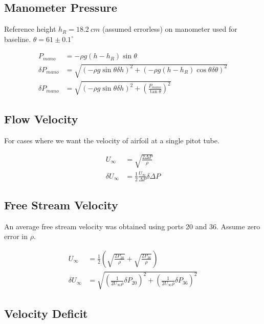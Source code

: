 \documentclass[runningheads]{llncs}
\begin{document}
\subsection{Manometer Pressure}

Reference height $h_R = 18.2 \ \si{cm}$ (assumed errorless) on manometer used for baseline. $\theta = 61 \pm 0.1^\circ$

\begin{align*}
    P_{mano} &= -\rho g (h - h_R) \sin\theta\\
    \delta P_{mano} &= \sqrt{\left(-\rho g \sin \theta \delta h\right)^2 + \left(-\rho g  (h-h_R)\cos\theta \delta \theta\right)^2}\\
    \delta P_{mano} &= \sqrt{\left(-\rho g \sin \theta \delta h\right)^2 + \left(\frac{P_{mano}}{\tan \theta}\right)^2}
\end{align*}

\subsection{Flow Velocity}

For cases where we want the velocity of airfoil at a single pitot tube.

\begin{align*}
    U_\infty &=  \sqrt{\frac{2 \Delta P}{\rho}} \\
    \delta U_\infty &= \frac{1}{2}\frac{U_\infty}{\Delta P} \delta \Delta P
\end{align*}

\subsection{Free Stream Velocity}

An average free stream velocity was obtained using ports 20 and 36. Assume zero error in $\rho$.

\begin{align*}
    U_\infty &= \frac{1}{2} \left(\sqrt{\frac{2 P_{20}}{\rho}} + \sqrt{\frac{2 P_{36}}{\rho}} \right) \\
    \delta U_\infty &= \sqrt{\left(\frac{1}{2U_\infty \rho} \delta P_{20}\right)^2 + \left(\frac{1}{2U_\infty \rho } \delta P_{36}\right)^2}
\end{align*}

\subsection{Velocity Deficit}
\end{document}
